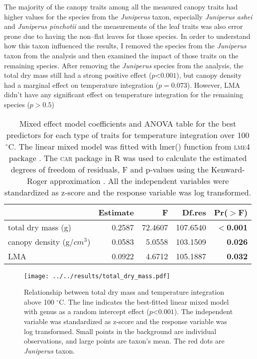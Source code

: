 \documentclass{ttuthes2007}
\newcommand{\pkg}[1]{\textsc{#1}}
\begin{document}
The majority of the canopy traits among all the measured canopy traits had higher values for the species from the \emph{Juniperus} taxon, especially \emph{Juniperus ashei} and \emph{Juniperus pinchotii} and the measurements of the leaf traits was also error prone due to having the non--flat leaves for those species. In order to understand how this taxon influenced the results, I removed the species from the \emph{Juniperus} taxon from the analysis and then examined the impact of those traits on the remaining species. After removing the \emph{Juniperus} species from the analysis, the total dry mass still had a strong positive effect ($p $<$ 0.001$), but canopy density had a marginal effect on temperature integration ($p = 0.073$). However, LMA didn't have any significant effect on temperature integration for the remaining species ($p > 0.5$) 



\begin{table}
\centering
\caption{Mixed effect model coefficients and ANOVA table for the best predictors for each type of traits for temperature integration over 100 $^{\circ}$C. The linear mixed model was fitted with lmer() function from \pkg{lme4} package \citep{bates2009package}. The \pkg{car} package in R \citep{fox2013hypothesis} was used to calculate the estimated degrees of freedom of residuals, F and p-values using the Kenward-Roger approximation \citep{kenward1997small}. All the independent variables were standardized  as z-score and the response variable was log transformed.}
\vspace{0.5 cm}
\begin{tabular}{lrrrr}
  \hline
 &  Estimate & F  & Df.res & Pr($>$F) \\ 
  \hline 
  total dry mass (g) & 0.2587 & 72.4607  & 107.6540 & \textbf{$<$0.001} \\ 
  canopy density (g/{$cm^3$}) & 0.0583 & 5.0558  & 103.1509 & \textbf{0.026} \\ 
  LMA & 0.0922 & 4.6712 &  105.1887 & \textbf{0.032} \\ 
   \hline
\end{tabular}
\label{tab:fandpstatfortemp}
\end{table}


\begin{figure}[ht]
    \centering
    \texttt{[image: ../../results/total\_dry\_mass.pdf]}
    \caption[Dry mass effect on temperature integration]{\label{fig:dm-tempint}Relationship between total dry mass and temperature integration above 100 $^{\circ}$C. The line indicates the best-fitted linear mixed model with genus as a random intercept effect ($p $<$ 0.001$). The independent variable was standardized  as z-score and the response variable was log transformed. Small points in the background are individual observations, and large points are taxon's mean. The red dots are \emph{Juniperus} taxon.}
\end{figure}
\end{document}
